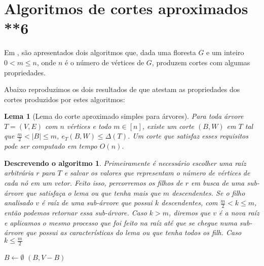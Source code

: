 \documentclass[a4paper,12pt]{article}
\newtheorem{lem}{Lema}
\newtheorem{alg}{Descrevendo o algoritmo}
\begin{document}
\section {Algoritmos de cortes aproximados **6}

Em \cite{Schmidt15}, são apresentados dois algoritmos que, dada uma 
floresta $G$ e um inteiro $0<m\le n$, onde $n$ é o número de vértices 
de $G$, produzem cortes com algumas propriedades.

Abaixo reproduzimos os dois resultados de \cite{Schmidt15} que 
atestam as propriedades dos cortes produzidos por estes algoritmos:

\bigskip
\bigskip
\bigskip
\bigskip

\begin{lem}[Lema do corte aproximado simples para árvores]

	Para toda árvore $T=(V,E)$ com $n$ vértices e todo $m \in [n]$,
	existe um corte $(B,W)$ em $T$ tal que 
	$\frac{m}{2} <|B| \le m$,
	$e_T(B,W) \le \Delta(T)$.
	Um corte que satisfaz esses requisitos pode ser computado em
	tempo $O(n)$.
\end{lem}

\medskip

\begin{alg}
	Primeiramente é necessário escolher uma raíz arbitrária $r$ para $T$
	e salvar os valores que representam o número de vértices de cada nó
	em um vetor.
	Feito isso, percorremos os filhos de $r$ em busca de uma sub-árvore que
	satisfaça o lema ou que tenha mais que $m$ descendentes. 
	Se o filho analisado $v$ é raíz de uma sub-árvore que possui $k$ 
	descendentes, com $\frac{m}{2}<k\le m$,
	então podemos retornar essa sub-árvore.
	Caso $k>m$, diremos que $v$ é a nova raíz e aplicamos o mesmo processo
	que foi feito na raíz até que se chegue numa sub-árvore que possui as
	características do lema ou que tenha todos os filh. 
	Caso $k\le \frac{m}{2}$
\end{alg}

\begin{algorithm}[H]

	\caption{Computa corte aproximado simples em árvores}
	$B \gets \emptyset$\;
	{
	}
	\Return $(B,V-B)$\;

\end{algorithm}	
\end{document}
